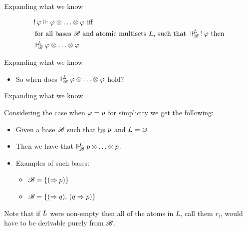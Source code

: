 \documentclass{beamer}
\begin{document}
\begin{frame}{Expanding what we know}
	\begin{center}
	\begin{align*}
	&\bang\varphi \suppM{}{} \varphi \mand \ldots \mand \varphi \text{ iff } \\
	&\text{ for all bases } \baseB \text{ and atomic multisets } \at{L} \text{, such that } \suppM{\baseB}{\at{L}} \bang\varphi \text{ then } \\ 
	&\suppM{\baseB}{\at{L}} \varphi \mand \ldots \mand \varphi
	\end{align*}
	\end{center}
\end{frame}
\begin{frame}{Expanding what we know}
	\begin{center}
	\begin{itemize}
	\item So when does $\Vdash_{ \!\!\mathscr{B} }^{ \!\!{L} } \varphi \otimes \ldots \otimes \varphi$ hold?
	\end{itemize}
	\end{center}
\end{frame}
\begin{frame}{Expanding what we know}
	\begin{center}
	Considering the case when $\varphi = {p}$ for simplicity we get the following:
	\begin{itemize}
	\pause
	\item Given a base $\mathscr{B}$ such that $\vdash_{\!\!\mathscr{B}}{p}$ and ${L}=\varnothing$.
	\pause
	\item Then we have that $\Vdash_{ \!\!\mathscr{B} }^{ \!\!{L} }{p} \otimes \ldots \otimes {p}$.
	\pause
	\item Examples of such bases:
	\begin{itemize}
		\item $\mathscr{B} = \{ (\Rightarrow p)\}$
		\item $\mathscr{B} = \{(\Rightarrow q),\, (q\Rightarrow p) \}$
	\end{itemize}
	\pause
	\end{itemize} 
	\vspace{10pt}
	Note that if ${L}$ were non-empty then all of the atoms in $L$, call them $r_i$, would have to be derivable purely from $\mathscr{B}$.
	\end{center}
\end{frame}
\end{document}
